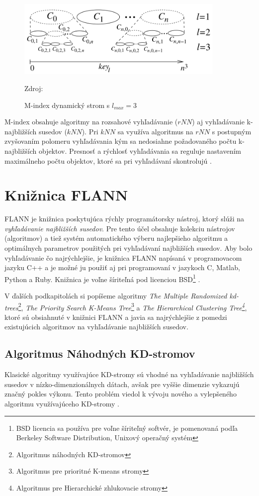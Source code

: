 \documentclass[12pt,a4paper,oneside]{fithesis2}
\begin{document}
\begin{figure}[h!]
  		\centering
  		\includegraphics[width=10cm]{obr/m-index_tree.png}
  		\caption{M-index dynamický strom s $l_{max}=3$} Zdroj: \cite{m-index} 
  		\label{dinamic-index}
\end{figure}

M-index obsahuje algoritmy na rozsahové vyhľadávanie ($rNN$) aj vyhľadávanie k-najbližších susedov ($kNN$). Pri $kNN$ sa využíva algoritmus na $rNN$ s postupným zvyšovaním polomeru vyhľadávania kým sa nedosiahne požadovaného počtu k-najbližších objektov. Presnosť a rýchlosť vyhľadávania sa reguluje nastavením maximálneho počtu objektov, ktoré sa pri vyhľadávaní skontrolujú \cite{m-index}. 

\chapter{Knižnica FLANN}
	FLANN je knižnica poskytujúca rýchly programátorsky nástroj, ktorý slúži na \textit{vyhľadávanie najbližších susedov}. Pre tento účel obsahuje kolekciu nástrojov (algoritmov) a tiež systém automatického výberu najlepšieho algoritmu a optimálnych parametrov použitých pri vyhľadávaní najbližších susedov. Aby bolo vyhľadávanie čo najrýchlejšie, je knižnica FLANN napísaná v programovacom jazyku C++ a je možné ju použiť aj pri programovaní v jazykoch C, Matlab, Python a Ruby. Knižnica je voľne šíriteľná pod licenciou BSD\footnote{BSD licencia sa používa pre voľne šíriteľný softvér, je pomenovaná podľa Berkeley Software Distribution, Unixový operačný systém} \cite{flann_pami_2014}.
	
V ďalších podkapitolách si popíšeme algoritmy 
\textit{The Multiple Randomized kd-trees}\footnote{Algoritmus náhodných KD-stromov},
\textit{The Priority Search K-Means Tree}\footnote{Algoritmus pre prioritné K-means stromy} a 
\textit{The Hierarchical Clustering Tree\protect\footnote{Algoritmus pre Hierarchické zhlukovacie stromy}}, ktoré sú obsiahnuté v knižnici FLANN a javia sa najrýchlejšie z pomedzi existujúcich algoritmov na vyhľadávanie najbližších susedov.
	\section{Algoritmus Náhodných KD-stromov}
Klasické algoritmy využívajúce KD-stromy sú vhodné na vyhľadávanie najbližších susedov v nízko-dimenzionálnych dátach, avšak pre vyššie dimenzie vykazujú značný pokles výkonu. Tento problém viedol k vývoju nového a vylepšeného algoritmu využívajúceho KD-stromy \cite{flann_pami_2014}. 
	
\end{document}
